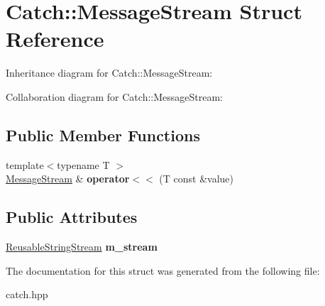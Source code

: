 \hypertarget{structCatch_1_1MessageStream}{}\section{Catch\+:\+:Message\+Stream Struct Reference}
\label{structCatch_1_1MessageStream}


Inheritance diagram for Catch\+:\+:Message\+Stream\+:


Collaboration diagram for Catch\+:\+:Message\+Stream\+:
\subsection*{Public Member Functions}
\begin{DoxyCompactItemize}
\item 
\mbox{\label{structCatch_1_1MessageStream_a554c4aff5925a077e9fe9d858217428d}} 
{\footnotesize template$<$typename T $>$ }\\\hyperlink{structCatch_1_1MessageStream}{Message\+Stream} \& {\bfseries operator$<$$<$} (T const \&value)
\end{DoxyCompactItemize}
\subsection*{Public Attributes}
\begin{DoxyCompactItemize}
\item 
\mbox{\label{structCatch_1_1MessageStream_a9202520faed8882ef469db9f353ec578}} 
\hyperlink{classCatch_1_1ReusableStringStream}{Reusable\+String\+Stream} {\bfseries m\+\_\+stream}
\end{DoxyCompactItemize}


The documentation for this struct was generated from the following file\+:\begin{DoxyCompactItemize}
\item 
catch.\+hpp\end{DoxyCompactItemize}
